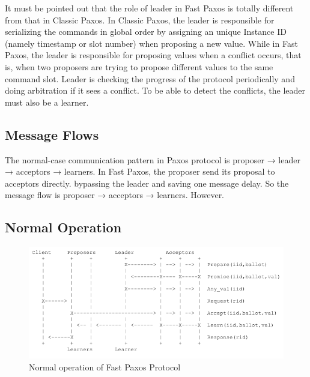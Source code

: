 \noindent It must be pointed out that the role of leader in Fast Paxos is totally different from that in Classic Paxos. In Classic Paxos, the leader is responsible for serializing the commands in global order by assigning an unique Instance ID (namely timestamp or slot number) when proposing a new value. While in Fast Paxos, the leader is responsible for proposing values when a conflict occurs, that is, when two proposers are trying to propose different values to the same command slot. Leader is checking the progress of the protocol periodically and doing arbitration if it sees a conflict. To be able to detect the conflicts, the leader must also be a learner.    

\subsection{Message Flows}
\noindent The normal-case communication pattern in Paxos protocol is proposer → leader → acceptors → learners. In Fast Paxos, the proposer send its proposal to acceptors directly. bypassing the leader and saving one message delay. So the message flow is proposer → acceptors → learners. However. 
\\

\subsection{Normal Operation}

\begin{figure}[ht!]
\centering
\includegraphics[width=160mm]{FP_no-conflict.png}
\caption{Normal operation of Fast Paxos Protocol}
\label{normalpax}
\end{figure}

